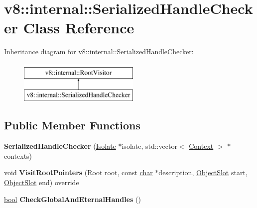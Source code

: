 \hypertarget{classv8_1_1internal_1_1SerializedHandleChecker}{}\section{v8\+:\+:internal\+:\+:Serialized\+Handle\+Checker Class Reference}
\label{classv8_1_1internal_1_1SerializedHandleChecker}
Inheritance diagram for v8\+:\+:internal\+:\+:Serialized\+Handle\+Checker\+:\begin{figure}[H]
\begin{center}
\leavevmode
\includegraphics[height=2.000000cm]{classv8_1_1internal_1_1SerializedHandleChecker}
\end{center}
\end{figure}
\subsection*{Public Member Functions}
\begin{DoxyCompactItemize}
\item 
\mbox{\label{classv8_1_1internal_1_1SerializedHandleChecker_a8d7add0b2afea1938ed3a605975ad770}} 
{\bfseries Serialized\+Handle\+Checker} (\mbox{\hyperlink{classv8_1_1internal_1_1Isolate}{Isolate}} $\ast$isolate, std\+::vector$<$ \mbox{\hyperlink{classv8_1_1internal_1_1Context}{Context}} $>$ $\ast$contexts)
\item 
\mbox{\label{classv8_1_1internal_1_1SerializedHandleChecker_a5e8e7a688d7aa2887276ee88fbd94d8c}} 
void {\bfseries Visit\+Root\+Pointers} (Root root, const \mbox{\hyperlink{classchar}{char}} $\ast$description, \mbox{\hyperlink{classv8_1_1internal_1_1ObjectSlot}{Object\+Slot}} start, \mbox{\hyperlink{classv8_1_1internal_1_1ObjectSlot}{Object\+Slot}} end) override
\item 
\mbox{\label{classv8_1_1internal_1_1SerializedHandleChecker_af700332c2e5635a045dc03b44a0610b4}} 
\mbox{\hyperlink{classbool}{bool}} {\bfseries Check\+Global\+And\+Eternal\+Handles} ()
\end{DoxyCompactItemize}
